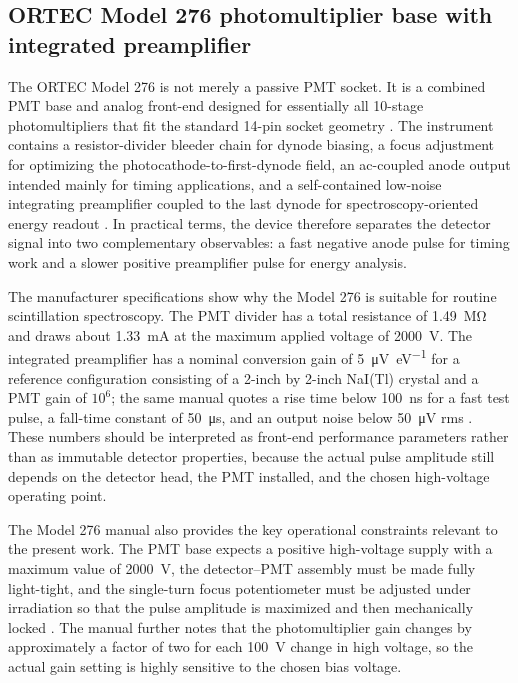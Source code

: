 \subsection{ORTEC Model 276 photomultiplier base with integrated preamplifier}

The ORTEC Model 276 is not merely a passive PMT socket. It is a combined PMT base and analog front-end designed for essentially all 10-stage photomultipliers that fit the standard 14-pin socket geometry \citep{ORTEC276Manual}. The instrument contains a resistor-divider bleeder chain for dynode biasing, a focus adjustment for optimizing the photocathode-to-first-dynode field, an ac-coupled anode output intended mainly for timing applications, and a self-contained low-noise integrating preamplifier coupled to the last dynode for spectroscopy-oriented energy readout \citep{ORTEC276Manual}. In practical terms, the device therefore separates the detector signal into two complementary observables: a fast negative anode pulse for timing work and a slower positive preamplifier pulse for energy analysis.

The manufacturer specifications show why the Model 276 is suitable for routine scintillation spectroscopy. The PMT divider has a total resistance of \SI{1.49}{\mega\ohm} and draws about \SI{1.33}{mA} at the maximum applied voltage of \SI{2000}{V}. The integrated preamplifier has a nominal conversion gain of \SI{5}{\micro\volt\per\electronvolt} for a reference configuration consisting of a 2-inch by 2-inch NaI(Tl) crystal and a PMT gain of $10^{6}$; the same manual quotes a rise time below \SI{100}{ns} for a fast test pulse, a fall-time constant of \SI{50}{\micro\second}, and an output noise below \SI{50}{\micro\volt} rms \citep{ORTEC276Manual}. These numbers should be interpreted as front-end performance parameters rather than as immutable detector properties, because the actual pulse amplitude still depends on the detector head, the PMT installed, and the chosen high-voltage operating point.

The Model 276 manual also provides the key operational constraints relevant to the present work. The PMT base expects a positive high-voltage supply with a maximum value of \SI{2000}{V}, the detector--PMT assembly must be made fully light-tight, and the single-turn focus potentiometer must be adjusted under irradiation so that the pulse amplitude is maximized and then mechanically locked \citep{ORTEC276Manual}. The manual further notes that the photomultiplier gain changes by approximately a factor of two for each \SI{100}{V} change in high voltage, so the actual gain setting is highly sensitive to the chosen bias voltage.

